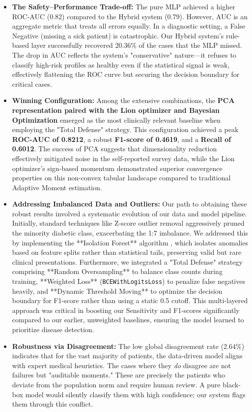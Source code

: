 \documentclass[conference]{IEEEtran}
\begin{document}
\begin{itemize}
    \item \textbf{The Safety--Performance Trade-off:} The pure MLP achieved a higher ROC-AUC (0.82) compared to the Hybrid system (0.79). However, AUC is an aggregate metric that treats all errors equally. In a diagnostic setting, a False Negative (missing a sick patient) is catastrophic. Our Hybrid system's rule-based layer successfully recovered 20.36\% of the cases that the MLP missed. The drop in AUC reflects the system's "conservative" nature—it refuses to classify high-risk profiles as healthy even if the statistical signal is weak, effectively flattening the ROC curve but securing the decision boundary for critical cases.
    \item \textbf{Winning Configuration:} Among the extensive combinations, the \textbf{PCA representation paired with the Lion optimizer and Bayesian Optimization} emerged as the most clinically relevant baseline when employing the "Total Defense" strategy. This configuration achieved a peak \textbf{ROC-AUC of 0.8212}, a robust \textbf{F1-score of 0.4619}, and a \textbf{Recall of 0.6012}. The success of PCA suggests that dimensionality reduction effectively mitigated noise in the self-reported survey data, while the Lion optimizer's sign-based momentum demonstrated superior convergence properties on this non-convex tabular landscape compared to traditional Adaptive Moment estimation.
    \item \textbf{Addressing Imbalanced Data and Outliers:} Our path to obtaining these robust results involved a systematic evolution of our data and model pipeline. Initially, standard techniques like Z-score outlier removal aggressively pruned the minority diabetic class, exacerbating the 1:7 imbalance. We addressed this by implementing the **Isolation Forest** algorithm \cite{cheng2019iforest}, which isolates anomalies based on feature splits rather than statistical tails, preserving valid but rare clinical presentations. Furthermore, we integrated a "Total Defense" strategy comprising **Random Oversampling** to balance class counts during training, **Weighted Loss** (\texttt{BCEWithLogitsLoss}) to penalize false negatives heavily, and **Dynamic Threshold Moving** to optimize the decision boundary for F1-score rather than using a static 0.5 cutoff. This multi-layered approach was critical in boosting our Sensitivity and F1-scores significantly compared to our earlier, unweighted baselines, ensuring the model learned to prioritize disease detection.
    \item \textbf{Robustness via Disagreement:} The low global disagreement rate (2.64\%) indicates that for the vast majority of patients, the data-driven model aligns with expert medical heuristics. The cases where they \textit{do} disagree are not failures but "auditable moments." These are precisely the patients who deviate from the population norm and require human review. A pure black-box model would silently classify them with high confidence; our system flags them through this conflict.

\end{itemize}
\end{document}
